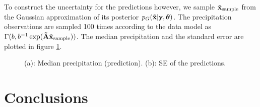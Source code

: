 \documentclass[a4paper,10pt]{article}
\def\btA{{\bf \tilde A}}
\def\bx{{\bf x}}
\def\by{{\bf y}}
\def\btx{{\bf{\tilde x}}}
\def\btheta{{\boldsymbol \theta}}
\def\txsample{{\tilde \bx_{\mathrm{sample}}}}
\begin{document}
To construct the uncertainty for the predictions however, we sample $\txsample$ from the Gaussian approximation of its posterior $p_G(\btx|\by, \btheta)$. The precipitation observations are sampled 100 times according to the data model as $\Gamma(b, b^{-1} \exp(\btA \txsample))$. The median precipitation and the standard error are plotted in figure \ref{fig:meshpred}.
\begin{figure}[ht]
\centering
  \qquad
  \caption{(a): Median precipitation (prediction). (b): SE of the predictions.}
\label{fig:meshpred}
\end{figure}
\section{Conclusions}
\end{document}
